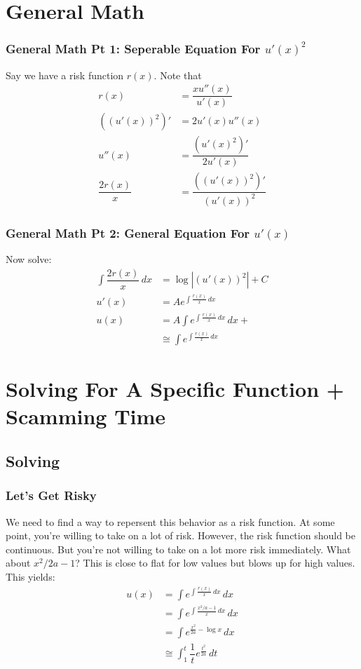 \documentclass{beamer}
\begin{document}
\section{General Math}
        \begin{frame}
            \frametitle{General Math Pt 1: Seperable Equation For $u'(x)^2$}
            Say we have a risk function $r(x)$. Note that
            \begin{align}
                r(x) &= \dfrac{xu''(x)}{u'(x)} \\
                ((u'(x))^2)' &= 2u'(x)u''(x) \\
                u''(x) &= \dfrac{(u'(x)^2)'}{2u'(x)} \\
                \dfrac{2r(x)}{x} &= \dfrac{((u'(x))^2)'}{(u'(x))^2}
            \end{align}
        \end{frame}
        \begin{frame}
            \frametitle{General Math Pt 2: General Equation For $u'(x)$}
            Now solve:
            \begin{align}
                \int \dfrac{2r(x)}{x} \, dx &= \log|(u'(x))^2| + C \\
                u'(x) &= Ae^{\int \frac{r(x)}{x} \, dx} \\
                u(x) &= A\int e^{\int \frac{r(x)}{x} \, dx} \, dx + \\
                &\cong \int e^{\int \frac{r(x)}{x} \, dx}
            \end{align}
        \end{frame}
\section{Solving For A Specific Function + Scamming Time}
    \subsection{Solving}
        \begin{frame}
            \frametitle{Let's Get Risky}
            We need to find a way to repersent this behavior as a risk function. At some point, you're willing to take on a lot of risk. \pause However, the risk function should be continuous.
            But you're not willing to take on a lot more risk immediately. What about $x^2/2a - 1$? This is close to flat for low values but blows up for high values. This yields: \pause
            \begin{align}
                u(x) &= \int e^{\int \frac{r(x)}{x} \, dx} \, dx  \\
                &= \int e^{\int \frac{x^2/a - 1}{x} \, dx} \, dx \\
                &= \int e^{\frac{x^2}{2a} - \log x} \, dx \\
                &\cong \int_{1}^{t} \dfrac{1}{t} e^{\frac{t^2}{2a}} \, dt
            \end{align}
        \end{frame}
\end{document}
